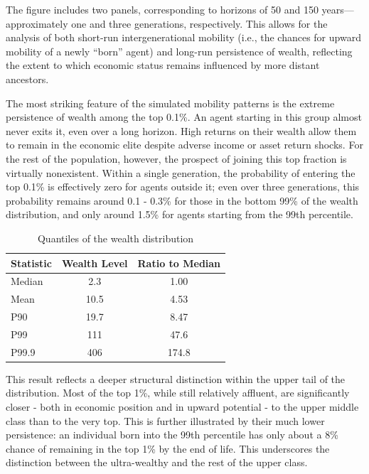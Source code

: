 \documentclass[12pt]{article}
\begin{document}
The figure includes two panels, corresponding to horizons of 50 and 150 years—approximately one and three generations, respectively. This allows for the analysis of both short-run intergenerational mobility (i.e., the chances for upward mobility of a newly “born” agent) and long-run persistence of wealth, reflecting the extent to which economic status remains influenced by more distant ancestors.

The most striking feature of the simulated mobility patterns is the extreme persistence of wealth among the top 0.1\%. An agent starting in this group almost never exits it, even over a long horizon. High returns on their wealth allow them to remain in the economic elite despite adverse income or asset return shocks. For the rest of the population, however, the prospect of joining this top fraction is virtually nonexistent. Within a single generation, the probability of entering the top 0.1\% is effectively zero for agents outside it; even over three generations, this probability remains around 0.1 - 0.3\% for those in the bottom 99\% of the wealth distribution, and only around 1.5\% for agents starting from the 99th percentile.

\begin{table}[htbp]
\centering
\caption{Quantiles of the wealth distribution}
\label{tab:quantlies}
\begin{tabular}{@{} lcc @{}}
\toprule
\textbf{Statistic} & \textbf{Wealth Level} & \textbf{Ratio to Median} \\
\midrule
Median      &  2.3  & 1.00  \\
Mean        &  10.5 & 4.53  \\
P90         &  19.7 & 8.47  \\
P99         &  111  & 47.6  \\
P99.9       &  406  & 174.8 \\
\bottomrule
\end{tabular}
\vspace{0.5em}
\end{table}


This result reflects a deeper structural distinction within the upper tail of the distribution. Most of the top 1\%, while still relatively affluent, are significantly closer - both in economic position and in upward potential - to the upper middle class than to the very top. This is further illustrated by their much lower persistence: an individual born into the 99th percentile has only about a 8\% chance of remaining in the top 1\% by the end of life. This underscores the distinction between the ultra-wealthy and the rest of the upper class.
\end{document}
